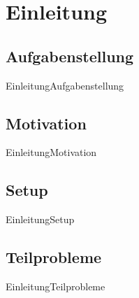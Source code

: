 
\section{Einleitung}

\subsection{Aufgabenstellung}

\begin{frame}{Einleitung}{Aufgabenstellung}
\end{frame}

\subsection{Motivation}

\begin{frame}{Einleitung}{Motivation}
\end{frame}

\subsection{Setup}

\begin{frame}{Einleitung}{Setup}
\end{frame}

\subsection{Teilprobleme}

\begin{frame}{Einleitung}{Teilprobleme}
\end{frame}

